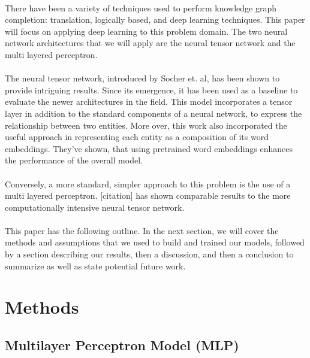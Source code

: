 \documentclass[11.5pt]{article}
\begin{document}
\paragraph{} There have been a variety of techniques used to perform knowledge graph completion: translation, logically based, and deep learning techniques. This paper will focus on applying deep learning to this problem domain. The two neural network architectures that we will apply are the neural tensor network and the multi layered perceptron. 

\paragraph{} The neural tensor network, introduced by Socher et. al, has been shown to provide intriguing results. Since its emergence, it has been used as a baseline to evaluate the newer architectures in the field. This model incorporates a tensor layer in addition to the standard components of a neural network, to express the relationship between two entities. More over, this work also incorporated the useful approach in representing each entity as a composition of its word embeddings. They've shown, that using pretrained word embeddings enhances the performance of the overall model.

\paragraph{}Conversely, a more standard, simpler approach to this problem is the use of a multi layered perceptron. [citation] has shown comparable results to the more computationally intensive neural tensor network.

\paragraph{}This paper has the following outline. In the next section, we will cover the methods and assumptions that we used to build and trained our models, followed by a section describing our results, then a discussion, and then a conclusion to summarize as well as state potential future work.

\section{Methods}
\subsection*{Multilayer Perceptron Model (MLP)}
\end{document}
